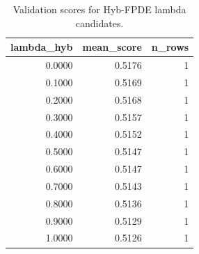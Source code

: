 \begin{table}[t]
\caption{Validation scores for Hyb-FPDE lambda candidates.}
\label{tab:lambda_distribution_computed}
\centering
\begin{tabular}{rrr}
\toprule
lambda\_hyb & mean\_score & n\_rows \\
\midrule
0.0000 & 0.5176 & 1 \\
0.1000 & 0.5169 & 1 \\
0.2000 & 0.5168 & 1 \\
0.3000 & 0.5157 & 1 \\
0.4000 & 0.5152 & 1 \\
0.5000 & 0.5147 & 1 \\
0.6000 & 0.5147 & 1 \\
0.7000 & 0.5143 & 1 \\
0.8000 & 0.5136 & 1 \\
0.9000 & 0.5129 & 1 \\
1.0000 & 0.5126 & 1 \\
\bottomrule
\end{tabular}

\end{table}
